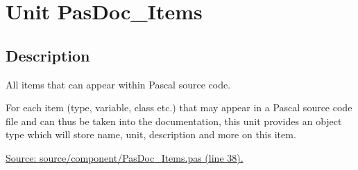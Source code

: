 \documentclass{report}
\begin{document}
\chapter{Unit PasDoc{\_}Items}
\label{PasDoc_Items}
\section{Description}
All items that can appear within Pascal source code.\hfill\vspace*{1ex}

        

For each item (type, variable, class etc.) that may appear in a Pascal source code file and can thus be taken into the documentation, this unit provides an object type which will store name, unit, description and more on this item.\par
\href{https://github.com/pasdoc/pasdoc/blob/master/source/component/PasDoc_Items.pas#L38}{Source: source/component/PasDoc{\_}Items.pas (line 38).}
\end{document}
